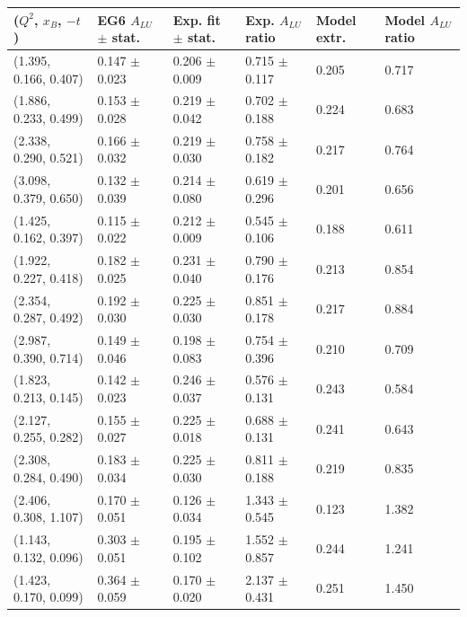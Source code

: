 \begin{landscape}
\begin{table}[!h]
   \begin{center}
      \begin{tabular}{||l|l|l|l|l|l||}
         \hline
 ($Q^{2}$, $x_{B}$, $-t$) & EG6 $A_{LU}$ $\pm$ stat. &  Exp. fit $\pm$ stat. & Exp. $A_{LU}$ ratio   &  Model extr. & Model $A_{LU}$ ratio \\
  \hline
 (1.395, 0.166, 0.407) & 0.147 $\pm$ 0.023 & 0.206 $\pm$ 0.009 & 0.715 $\pm$ 0.117 & 0.205 & 0.717 \\
 (1.886, 0.233, 0.499) & 0.153 $\pm$ 0.028 & 0.219 $\pm$ 0.042 & 0.702 $\pm$ 0.188 & 0.224 & 0.683 \\
 (2.338, 0.290, 0.521) & 0.166 $\pm$ 0.032 & 0.219 $\pm$ 0.030 & 0.758 $\pm$ 0.182 & 0.217 & 0.764 \\
 (3.098, 0.379, 0.650) & 0.132 $\pm$ 0.039 & 0.214 $\pm$ 0.080 & 0.619 $\pm$ 0.296 & 0.201 & 0.656 \\
   \hline \hline  \hline                                                                     
 (1.425, 0.162, 0.397) & 0.115 $\pm$ 0.022 & 0.212 $\pm$ 0.009 & 0.545 $\pm$ 0.106 & 0.188 & 0.611 \\
 (1.922, 0.227, 0.418) & 0.182 $\pm$ 0.025 & 0.231 $\pm$ 0.040 & 0.790 $\pm$ 0.176 & 0.213 & 0.854 \\
 (2.354, 0.287, 0.492) & 0.192 $\pm$ 0.030 & 0.225 $\pm$ 0.030 & 0.851 $\pm$ 0.178 & 0.217 & 0.884 \\
 (2.987, 0.390, 0.714) & 0.149 $\pm$ 0.046 & 0.198 $\pm$ 0.083 & 0.754 $\pm$ 0.396 & 0.210 & 0.709 \\
   \hline  \hline  \hline                                                                    
 (1.823, 0.213, 0.145) & 0.142 $\pm$ 0.023 & 0.246 $\pm$ 0.037 & 0.576 $\pm$ 0.131 & 0.243 & 0.584 \\
 (2.127, 0.255, 0.282) & 0.155 $\pm$ 0.027 & 0.225 $\pm$ 0.018 & 0.688 $\pm$ 0.131 & 0.241 & 0.643 \\
 (2.308, 0.284, 0.490) & 0.183 $\pm$ 0.034 & 0.225 $\pm$ 0.030 & 0.811 $\pm$ 0.188 & 0.219 & 0.835 \\
 (2.406, 0.308, 1.107) & 0.170 $\pm$ 0.051 & 0.126 $\pm$ 0.034 & 1.343 $\pm$ 0.545 & 0.123 & 1.382 \\
   \hline  \hline  \hline                                                                    
 (1.143, 0.132, 0.096) & 0.303 $\pm$ 0.051 & 0.195 $\pm$ 0.102 & 1.552 $\pm$ 0.857 & 0.244 & 1.241 \\
 (1.423, 0.170, 0.099) & 0.364 $\pm$ 0.059 & 0.170 $\pm$ 0.020 & 2.137 $\pm$ 0.431 & 0.251 & 1.450 \\

\end{tabular}
\end{center}
\end{table}
\end{landscape}

